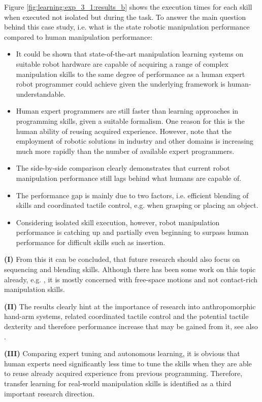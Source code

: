 Figure \ref{fig:learning:exp_3_1:results_b} shows the execution times for each skill when executed not isolated but during the task.
To answer the main question behind this case study, i.e. what is the state robotic manipulation performance compared to human manipulation performance:
\begin{itemize}
\item It could be shown that state-of-the-art manipulation learning systems on suitable robot hardware are capable of acquiring a range of complex manipulation skills to the same degree of performance as a human expert robot programmer could achieve given the underlying framework is human-understandable.
\item Human expert programmers are still faster than learning approaches in programming skills, given a suitable formalism.
One reason for this is the human ability of reusing acquired experience.
However, note that the employment of robotic solutions in industry and other domains is increasing much more rapidly than the number of available expert programmers.
\item The side-by-side comparison clearly demonstrates that current robot manipulation performance still lags behind what humans are capable of.
\item The performance gap is mainly due to two factors, i.e. efficient blending of skills and coordinated tactile control, e.g. when grasping or placing an object.
\item Considering isolated skill execution, however, robot manipulation performance is catching up and partially even beginning to surpass human performance for difficult skills such as insertion.
\end{itemize}

\textbf{(I)} From this it can be concluded, that future research should also focus on sequencing and blending skills.
Although there has been some work on this topic already, e.g. \cite{Huang.2011}, it is mostly concerned with free-space motions and not contact-rich manipulation skills.

\textbf{(II)} The results clearly hint at the importance of research into anthropomorphic hand-arm systems, related coordinated tactile control and the potential tactile dexterity and therefore performance increase that may be gained from it, see also \cite{Billard.2019}.

\textbf{(III)} Comparing expert tuning and autonomous learning, it is obvious that human experts need significantly less time to tune the skills when they are able to reuse already acquired experience from previous programming.
Therefore, transfer learning for real-world manipulation skills is identified as a third important research direction.
